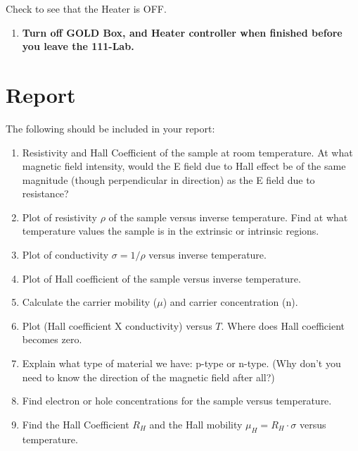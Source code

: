 \documentclass{../lab}
\begin{document}
Check to see that the Heater is OFF.

\begin{enumerate}
    \item \textbf{Turn off GOLD Box, and Heater controller when finished before you leave the 111-Lab.}

\end{enumerate}

\section{Report}

The following should be included in your report:

\begin{enumerate}
    \item Resistivity and Hall Coefficient of the sample at room temperature. At what magnetic field intensity, would the E field due to Hall effect be of the same magnitude (though perpendicular in direction) as the E field due to resistance?

    \item Plot of resistivity $\rho$ of the sample versus inverse temperature. Find at what temperature values the sample is in the extrinsic or intrinsic regions.

    \item Plot of conductivity $\sigma = 1/\rho$ versus inverse temperature.

    \item Plot of Hall coefficient of the sample versus inverse temperature.

    \item Calculate the carrier mobility ($\mu$) and carrier concentration (n).

    \item Plot (Hall coefficient X conductivity) versus $T$. Where does Hall coefficient becomes zero.

    \item Explain what type of material we have: p-type or n-type. (Why don't you need to know the direction of the magnetic field after all?)

    \item Find electron or hole concentrations for the sample versus temperature.\\
    
    \item Find the Hall Coefficient $ R_H $ and the Hall mobility $\mu_H = R_H \cdot \sigma$ versus temperature.


\end{enumerate}
\end{document}
